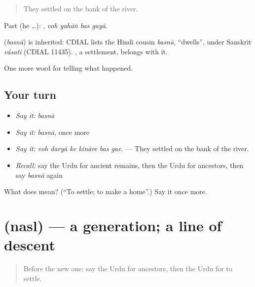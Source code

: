 \begin{quote}
They settled on the bank of the river.
\end{quote}

Past (he …):    , \emph{voh yahāṅ bas gayā}.

\begin{cousinweb}
\textbf{} (\emph{basnā}) is inherited: CDIAL lists the Hindi cousin \emph{basnā}, \textquotedblleft{}dwells\textquotedblright{}, under Sanskrit \emph{vásati} (CDIAL 11435). \textbf{}, a settlement, belongs with it.
\end{cousinweb}

\begin{grammarlens}[title={What you've built}]
One more word for telling what happened.
\end{grammarlens}

\subsection*{Your turn}
\begin{itemize}
\raggedright
  \item \emph{Say it:} \emph{basnā}
  \item \emph{Say it:} \emph{basnā}, once more
  \item \emph{Say it:} \emph{voh daryā ke kināre bas gae.} — They settled on the bank of the river.
  \item \emph{Recall:} say the Urdu for ancient remains, then the Urdu for ancestors, then say \emph{basnā} again
\end{itemize}

\begin{tcolorbox}[breakable,colback=teal!4,colframe=teal!35!black,title={Before you move on}]
What does  mean? (\textquotedblleft{}To settle; to make a home\textquotedblright{}.) Say it once more.
\end{tcolorbox}
\section[\texorpdfstring{\ur{نسل} (nasl)}{نسل (nasl)}]{ (nasl) — a generation; a line of descent}

\label{lesson:UR-C315-nasl}



\begin{quote}
Before the new one: say the Urdu for ancestors, then the Urdu for to settle.
\end{quote}

